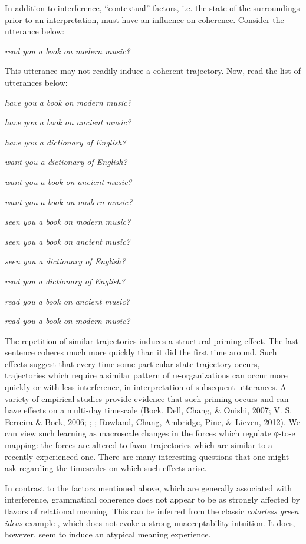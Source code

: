  In addition to interference, “contextual” factors, i.e. the state of the surroundings prior to an interpretation, must have an influence on coherence. Consider the utterance below:

    \textit{read you a book on modern music?}

This utterance may not readily induce a coherent trajectory. Now, read the list of utterances below:

\textit{have you a book on modern music?}

\textit{have you a book on ancient music?}

\textit{have you a dictionary of English?}

\textit{want you a dictionary of English?}

\textit{want you a book on ancient music?}

\textit{want you a book on modern music?}

\textit{seen you a book on modern music?}

\textit{seen you a book on ancient music?}

\textit{seen you a dictionary of English?}

\textit{read you a dictionary of English?}

\textit{read you a book on ancient music?}

\textit{read you a book on modern music?}

  The repetition of similar trajectories induces a structural priming effect. The last sentence coheres much more quickly than it did the first time around. Such effects suggest that every time some particular state trajectory occurs, trajectories which require a similar pattern of re-organizations can occur more quickly or with less interference, in interpretation of subsequent utterances. A variety of empirical studies provide evidence that such priming occurs and can have effects on a multi-day timescale (Bock, Dell, Chang, \& Onishi, 2007; V. S. Ferreira \& Bock, 2006; \citealt{Nagata1988,Nagata1992}; \citealt{PickeringFerreira2008}; Rowland, Chang, Ambridge, Pine, \& Lieven, 2012). We can view such learning as macroscale changes in the forces which regulate φ-to-e mapping: the forces are altered to favor trajectories which are similar to a recently experienced one. There are many interesting questions that one might ask regarding the timescales on which such effects arise.

In contrast to the factors mentioned above, which are generally associated with interference, grammatical coherence does not appear to be as strongly affected by flavors of relational meaning. This can be inferred from the classic \textit{colorless green ideas} example \citep{Chomsky1956}, which does not evoke a strong unacceptability intuition. It does, however, seem to induce an atypical meaning experience.

